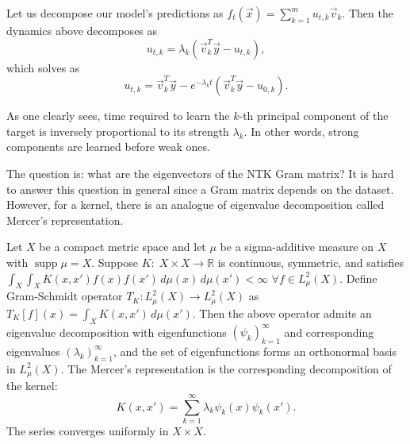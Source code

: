 \documentclass{article}
\newcommand{\RR}{\mathbb{R}}
\DeclareMathOperator*{\supp}{supp}
\begin{document}
    Let us decompose our model's predictions as $f_t(\vec x) = \sum_{k=1}^m u_{t,k} \vec v_k$.
    Then the dynamics above decomposes as
    \begin{equation}
        u_{t,k}
        = \lambda_k (\vec v_k^T \vec y - u_{t,k}),
    \end{equation}
    which solves as
    \begin{equation}
        u_{t,k} 
        = \vec v_k^T \vec y - e^{-\lambda_k t} (\vec v_k^T \vec y - u_{0,k}).
    \end{equation}

    As one clearly sees, time required to learn the $k$-th principal component of the target is inversely proportional to its strength $\lambda_k$.
    In other words, strong components are learned before weak ones.
    
    The question is: what are the eigenvectors of the NTK Gram matrix?
    It is hard to answer this question in general since a Gram matrix depends on the dataset.
    However, for a kernel, there is an analogue of eigenvalue decomposition called Mercer's representation.

    Let $X$ be a compact metric space and let $\mu$ be a sigma-additive measure on $X$ with $\supp \mu = X$.
    Suppose $K: \; X \times X \to \RR$ is continuous, symmetric, and satisfies $\int_X \int_X K(x,x') f(x) f(x') \, d\mu(x) \, d\mu(x') < \infty$ $\forall f \in L^2_\mu(X)$.
    Define Gram-Schmidt operator $T_K: L^2_\mu(X) \to L^2_\mu(X)$ as $T_K[f](x) = \int_X K(x,x') \, d\mu(x')$.
    Then the above operator admits an eigenvalue decomposition with eigenfunctions $(\psi_k)_{k=1}^\infty$ and corresponding eigenvalues $(\lambda_k)_{k=1}^\infty$, and the set of eigenfunctions forms an orthonormal basis in $L^2_\mu(X)$.
    The Mercer's representation is the corresponding decomposition of the kernel:
    \begin{equation}
        K(x,x')
        = \sum_{k=1}^\infty \lambda_k \psi_k(x) \psi_k(x').
    \end{equation}
    The series converges uniformly in $X \times X$.
\end{document}
